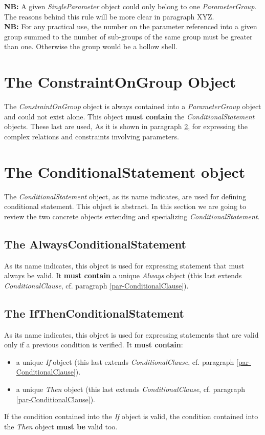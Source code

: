 \documentclass[a4paper,11pt] {article}
\begin{document}
{\bf NB:} A given {\it SingleParameter} object could only belong to one {\it ParameterGroup}. The reasons behind this rule will be more clear in paragraph XYZ.\\

{\bf NB:}  For any practical use, the number on the parameter referenced into a given group summed to the number of sub-groups of the same group must be greater than one. Otherwise the group would be a hollow shell.

\section{The ConstraintOnGroup Object}\label{par-ConstraintsOnGroup}
The {\it  ConstraintOnGroup} object is always contained into a {\it ParameterGroup} object and could not exist alone. 
This object {\bf must contain} the {\it ConditionalStatement} objects. These last are used, As it is shown in paragraph \ref{par-ConditionalStatement}, for expressing the complex relations and constraints involving parameters.

\section{The ConditionalStatement object}\label{par-ConditionalStatement}
The {\it ConditionalStatement} object, as its name indicates, are used for defining conditional statement. This object is abstract. In this section we are going to review the two concrete objects extending and specializing  {\it ConditionalStatement}. 

\subsection{The AlwaysConditionalStatement}\label{par-AlwaysConditionalStatement}
As its name indicates, this object is used for expressing statement that must always be valid. It {\bf must contain} a unique {\it Always} object (this last extends {\it ConditionalClause}, cf. paragraph \ref{par-ConditionalClause}).

\subsection{The IfThenConditionalStatement}\label{par-IfThenConditionalStatement}
As its name indicates, this object is used for expressing statements that are valid only if a previous condition is verified. It {\bf must contain}:
\begin{itemize}
\item a unique {\it If} object (this last extends {\it ConditionalClause}, cf. paragraph \ref{par-ConditionalClause}).
\item a unique {\it Then} object (this last extends {\it ConditionalClause}, cf. paragraph \ref{par-ConditionalClause}).
\end{itemize}
If the condition contained into the {\it If} object is valid, the condition contained into the {\it Then} object {\bf must be} valid too.
\end{document}
